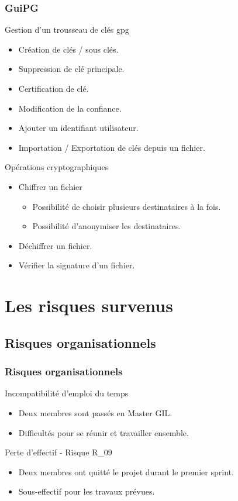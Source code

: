\begin{frame}
  \frametitle{\color{white}GuiPG}
  \begin{block}{Gestion d'un trousseau de clés gpg}
      \begin{itemize}
        \item Création de clés / sous clés.
        \item Suppression de clé principale.
        \item Certification de clé.
        \item Modification de la confiance.
        \item Ajouter un identifiant utilisateur.
        \item Importation / Exportation de clés depuis un fichier.
      \end{itemize}
    \end{block}
    \pause
    \begin{block}{Opérations cryptographiques}
      \begin{itemize}
        \item Chiffrer un fichier
	  \begin{itemize}
	   \item Possibilité de choisir plusieurs destinataires à la fois.
	   \item Possibilité d'anonymiser les destinataires.
	  \end{itemize}
        \item Déchiffrer un fichier.
        \item Vérifier la signature d'un fichier.
      \end{itemize}
    \end{block}
\end{frame}


\section{Les risques survenus}
  \subsection{Risques organisationnels}
    \begin{frame}
      \frametitle{\color{white}Risques organisationnels}
      \begin{block}{Incompatibilité d'emploi du temps}
	\begin{itemize}
	  \item Deux membres sont passés en Master GIL.
	  \item Difficultés pour se réunir et travailler ensemble.
	\end{itemize}
      \end{block}
      \begin{block}{Perte d'effectif - Risque R\_09}
      	\begin{itemize}
      	  \item Deux membres ont quitté le projet durant le premier sprint.
      	  \item Sous-effectif pour les travaux prévues.
      	\end{itemize}
      \end{block}
    \end{frame}
    
